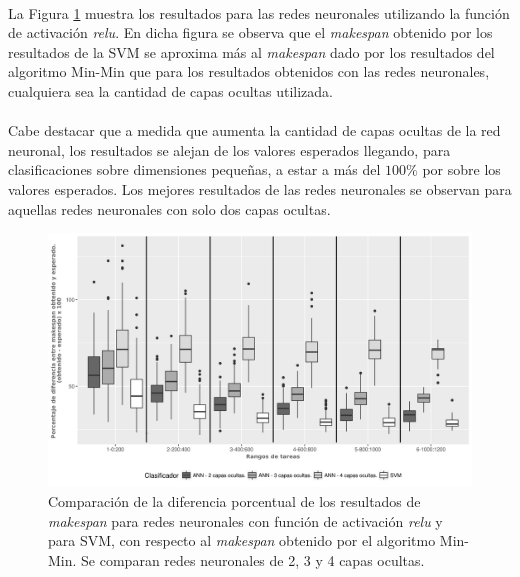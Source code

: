 \paragraph{}La Figura \ref{fig:relu234} muestra los resultados para las redes neuronales utilizando la función de activación \textit{relu}.
En dicha figura se observa que el \textit{makespan} obtenido por los resultados de la SVM se aproxima más al \textit{makespan} dado por los resultados del algoritmo Min-Min que para los resultados obtenidos con las redes neuronales, cualquiera sea la cantidad de capas ocultas utilizada. 

\paragraph{} Cabe destacar que a medida que aumenta la cantidad de capas ocultas de la red neuronal, los resultados se alejan de los valores esperados llegando, para clasificaciones sobre dimensiones pequeñas, a estar a más del $100\%$ por sobre los valores esperados.
Los mejores resultados de las redes neuronales se observan para aquellas redes neuronales con solo dos capas ocultas.


\begin{figure}[H]
  \centering
  \includegraphics[width=\columnwidth]{imagenes/comparacion_anns_relu_2.png}
  \caption{Comparación de  la diferencia porcentual  de los resultados de \textit{makespan} para redes neuronales con función de activación \textit{relu} y para SVM, con respecto al \textit{makespan} obtenido por el algoritmo Min-Min.
Se comparan redes neuronales de 2, 3 y 4 capas ocultas.}
  \label{fig:relu234}
\end{figure}

